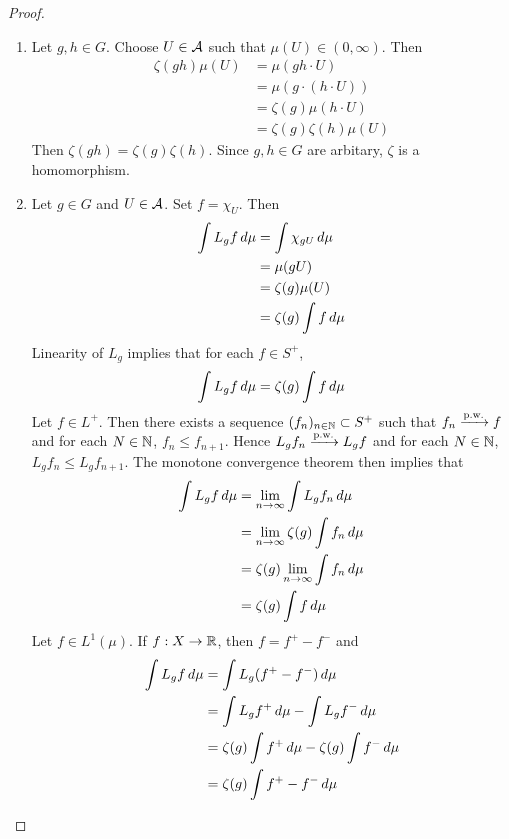 \documentclass{book}
\begin{document}
	\begin{proof}\
		\begin{enumerate}
			\item Let $g,h \in G$. Choose $U \in \mathcal{A}$ such that $\mu(U) \in (0, \infty)$. Then 
			\begin{align*}
				\zeta(gh) \mu(U)
				&= \mu(gh \cdot U) \\
				&= \mu(g \cdot (h \cdot U)) \\
				&= \zeta(g) \mu(h \cdot U) \\
				&= \zeta(g) \zeta(h) \mu(U)
			\end{align*}
			Then $\zeta(gh) = \zeta(g) \zeta(h)$. Since $g, h \in G$ are arbitary, $\zeta$ is a homomorphism.
			\item Let $g \in G$ and $U \in \mathcal{A}$. Set $f = \chi_U$. Then 
			\begin{align*}
				\int L_g f \, d \mu
				&= \int \chi_{gU} \, d \mu \\
				&= \mu(gU) \\
				&= \zeta(g) \mu(U) \\
				&= \zeta(g) \int f \, d \mu \\
			\end{align*} 
			Linearity of $L_g$ implies that for each $f \in S^+$, 
			$$\int L_g f \, d \mu = \zeta(g) \int f \, d \mu \\$$
			Let $f \in L^+$. Then there exists a sequence $(f_n)_{n \in \mathbb{N}} \subset S^+$ such that $f_n \xrightarrow{\text{p.w.}} f$ and for each $N \in \mathbb{N}$, $f_n \leq f_{n+1}$. Hence $L_g f_n \xrightarrow{\text{p.w.}} L_gf$ and for each $N \in \mathbb{N}$, $L_g f_n \leq L_g f_{n+1}$. The monotone convergence theorem then implies that 
			\begin{align*}
				\int L_g f \, d \mu
				&= \lim \limits_{n \rightarrow \infty} \int L_g f_n \, d \mu \\
				&= \lim \limits_{n \rightarrow \infty} \zeta(g) \int f_n \, d \mu \\ 
				&= \zeta(g) \lim \limits_{n \rightarrow \infty} \int f_n \, d \mu \\ 
				&= \zeta(g) \int f \, d \mu \\
			\end{align*} 
		Let $f \in L^1(\mu)$. If $f:X \rightarrow \mathbb{R}$, then $f = f^+ - f^-$ and 
		\begin{align*}
			\int L_g f \dmu
			&= \int L_g(f^+ - f^-) \dmu \\
			&= \int L_g f^+ \dmu - \int L_g f^- \dmu \\
			&= \zeta(g) \int f^+ \dmu - \zeta(g) \int f^- \dmu \\
			&= \zeta(g) \int f^+  -  f^- \dmu \\

\end{align*}
\end{enumerate}
\end{proof}
\end{document}
